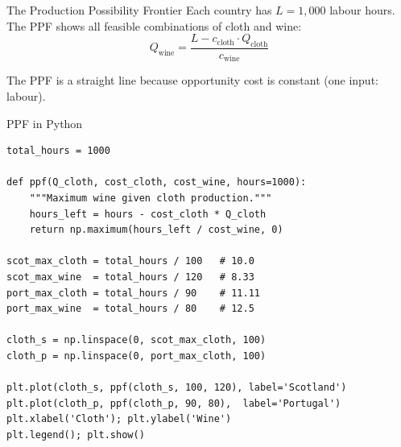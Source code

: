 \documentclass[aspectratio=169, 10pt]{beamer}
\begin{document}
\begin{frame}{The Production Possibility Frontier}
Each country has $L = 1{,}000$ labour hours. The PPF shows all
feasible combinations of cloth and wine:
\[
  Q_{\text{wine}} = \frac{L - c_{\text{cloth}} \cdot Q_{\text{cloth}}}{c_{\text{wine}}}
\]
\begin{center}
\end{center}
The PPF is a straight line because opportunity cost is constant (one input: labour).
\end{frame}

\begin{frame}[fragile]{PPF in Python}
\begin{lstlisting}
total_hours = 1000

def ppf(Q_cloth, cost_cloth, cost_wine, hours=1000):
    """Maximum wine given cloth production."""
    hours_left = hours - cost_cloth * Q_cloth
    return np.maximum(hours_left / cost_wine, 0)

scot_max_cloth = total_hours / 100   # 10.0
scot_max_wine  = total_hours / 120   # 8.33
port_max_cloth = total_hours / 90    # 11.11
port_max_wine  = total_hours / 80    # 12.5

cloth_s = np.linspace(0, scot_max_cloth, 100)
cloth_p = np.linspace(0, port_max_cloth, 100)

plt.plot(cloth_s, ppf(cloth_s, 100, 120), label='Scotland')
plt.plot(cloth_p, ppf(cloth_p, 90, 80),  label='Portugal')
plt.xlabel('Cloth'); plt.ylabel('Wine')
plt.legend(); plt.show()
\end{lstlisting}
\end{frame}
\end{document}
